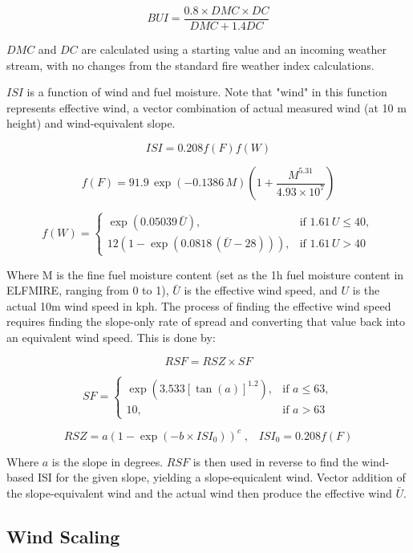 \[
BUI = \frac{0.8\times DMC\times DC}{DMC+1.4DC}
\]

$DMC$ and $DC$ are calculated using a starting value and an incoming weather stream, with no changes from the standard fire weather index calculations. 

$ISI$ is a function of wind and fuel moisture. Note that "wind" in this function represents effective wind, a vector combination of actual measured wind (at 10 m height) and wind-equivalent slope. 

\[
ISI = 0.208f(F)f(W)
\]

\[
f(F) = 91.9\,\exp(-0.1386\,M)
\left(1 + \frac{M^{5.31}}{4.93 \times 10^{7}}\right)
\]

\[
f(W) = 
\begin{cases}
\exp\!\left(0.05039\,\bar{U}\right),
& \text{if } 1.61\,U \le 40, \\[6pt]
12\left(1 - \exp\!\left(0.0818\,(\bar{U} - 28)\right)\right),
& \text{if } 1.61\,U > 40
\end{cases}
\]

Where M is the fine fuel moisture content (set as the 1h fuel moisture content in ELFMIRE, ranging from 0 to 1), $\bar{U}$ is the effective wind speed, and $U$ is the actual 10m wind speed in kph. The process of finding the effective wind speed requires finding the slope-only rate of spread and converting that value back into an equivalent wind speed. This is done by:

\begin{equation}
    RSF = RSZ \times SF
\end{equation}

\[
SF =
\begin{cases}
\exp\!\left( 3.533 \left[\tan\!\left(a\right)\right]^{1.2} \right),
& \text{if } a \le 63, \\[6pt]
10,
& \text{if } a > 63
\end{cases}
\]

\[
RSZ=a(1-\exp(-b \times ISI_0))^{c}\;,\;\;\; ISI_0=0.208f(F)
\]

Where $a$ is the slope in degrees. $RSF$ is then used in reverse to find the wind-based ISI for the given slope, yielding a slope-equicalent wind. Vector addition of the slope-equivalent wind and the actual wind then produce the effective wind $\bar{U}$. 

\subsection{Wind Scaling}

